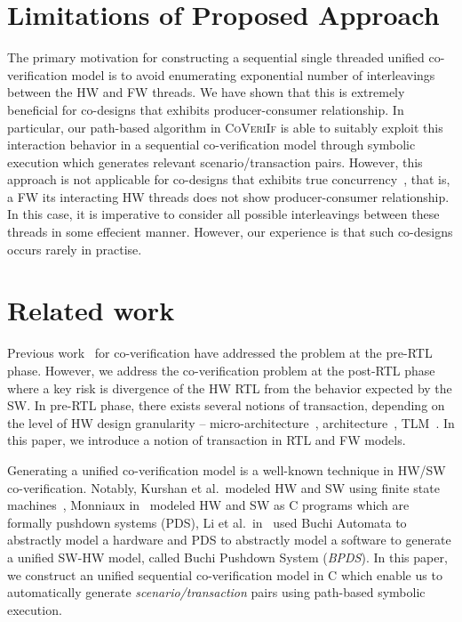 \documentclass[sigconf]{acmart}
\newcommand{\tool}[1]{\textsc{#1}\xspace}
\newcommand{\verifox}{\tool{CoVeriIf}}
\begin{document}
\section{Limitations of Proposed Approach}
The primary motivation for constructing a sequential single threaded unified 
co-verification model is to avoid enumerating exponential number of interleavings 
between the HW and FW threads.  We have shown that this is extremely beneficial for 
co-designs that exhibits producer-consumer relationship.  
In particular, our path-based algorithm in \verifox is able to suitably exploit 
this interaction behavior in a sequential co-verification model through symbolic 
execution which generates relevant scenario/transaction pairs.  However, this approach 
is not applicable for co-designs that exhibits true concurrency~\cite{concurrency}, 
that is, a FW its interacting HW threads does not show producer-consumer relationship.  
In this case, it is imperative to consider all possible interleavings between
these threads in some effecient manner.  However, our experience is that such 
co-designs occurs rarely in practise. 


\section{Related work}

Previous work~\cite{codes14,codes15,fmcad13,memocode06} for 
co-verification have addressed the problem at the pre-RTL phase. 
However, we address the co-veri\-fi\-cation problem at the post-RTL
phase~\cite{fase10,vlsid13} where a key risk is divergence of the 
HW RTL from the behavior expected by the SW. In pre-RTL phase, 
there exists several notions of transaction, depending on the level 
of HW design granularity -- micro-architecture~\cite{mcbmq},
architecture~\cite{mcbmq}, TLM~\cite{tlm-book,hvc}. In this paper, 
we introduce a notion of transaction in RTL and FW models.      

Generating a unified co-verification model is a well-known 
technique in HW/SW co-verification.  Notably, Kurshan et al.~modeled HW and 
SW using finite state machines~\cite{fmsd02}, Monniaux in~\cite{emsoft07} modeled
HW and SW as C programs which are formally pushdown systems (PDS), 
Li et al.~in~\cite{fase10} used Buchi Automata to abstractly
model a hardware and PDS to abstractly model a software to generate a unified SW-HW model, 
called Buchi Pushdown System ({\em BPDS}).  In this paper, we construct an unified 
sequential co-verification model in C which enable us to automatically 
generate {\em scenario/transaction} pairs using path-based symbolic execution. 
\end{document}
